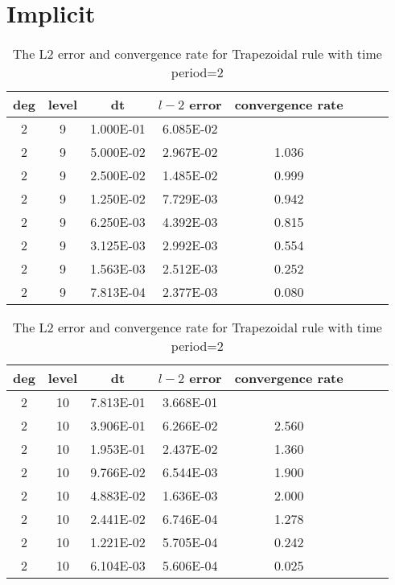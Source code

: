 \documentclass[a4paper]{article}
\begin{document}
\section{Implicit}


\begin{table}[htbp]
\caption{\label{tab:test}The L2 error and convergence rate for Backward Euler with time period=1.5}
\centering
\vspace{5pt}

\begin{tabular}{cccccccc}
\toprule
deg & level&dt&$l-2$ error & convergence rate\\
\midrule
2&9&1.000E-01&6.085E-02&\\
2&9&5.000E-02&2.967E-02&1.036\\
2&9&2.500E-02&1.485E-02&0.999\\
2&9&1.250E-02&7.729E-03&0.942\\
2&9&6.250E-03&4.392E-03&0.815\\
2&9&3.125E-03&2.992E-03&0.554\\
2&9&1.563E-03&2.512E-03&0.252\\
2&9&7.813E-04&2.377E-03&0.080\\

\bottomrule
\end{tabular}

\caption{\label{tab:test}The L2 error and convergence rate for Trapezoidal rule with time period=2}
\centering
\vspace{5pt}

\begin{tabular}{cccccccc}
\toprule
deg & level&dt&$l-2$ error & convergence rate\\
\midrule
2&10&7.813E-01&3.668E-01&\\
2&10&3.906E-01&6.266E-02&2.560\\
2&10&1.953E-01&2.437E-02&1.360\\
2&10&9.766E-02&6.544E-03&1.900\\
2&10&4.883E-02&1.636E-03&2.000\\
2&10&2.441E-02&6.746E-04&1.278\\
2&10&1.221E-02&5.705E-04&0.242\\
2&10&6.104E-03&5.606E-04&0.025\\

\bottomrule
\end{tabular}

\end{table}
\end{document}
